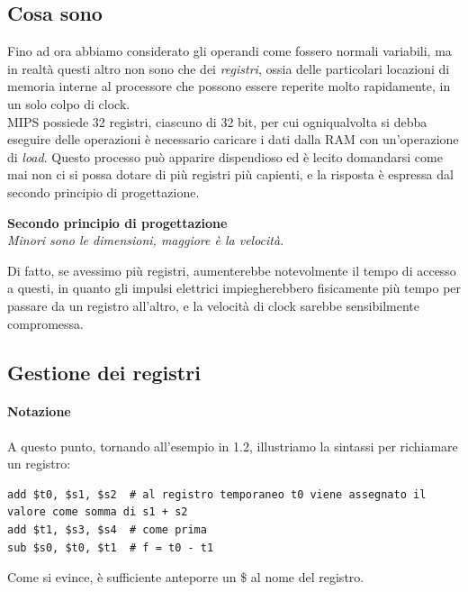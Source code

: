 \documentclass[class=book, crop=false]{standalone}
\begin{document}
\subsection*{Cosa sono}

Fino ad ora abbiamo considerato gli operandi come fossero normali variabili, ma in realtà questi altro non sono che dei \emph{registri}, ossia delle particolari locazioni di memoria interne al processore che possono essere reperite molto rapidamente, in un solo colpo di clock.\\

MIPS possiede 32 registri, ciascuno di 32 bit, per cui ogniqualvolta si debba eseguire delle operazioni è necessario caricare i dati dalla RAM con un'operazione di \emph{load}. Questo processo può apparire dispendioso ed è lecito domandarsi come mai non ci si possa dotare di più registri più capienti, e la risposta è espressa dal secondo principio di progettazione.

\vspace{8pt}
\begin{tcolorbox}
\centering
\textbf{Secondo principio di progettazione}\\
\emph{Minori sono le dimensioni, maggiore è la velocità}.
\end{tcolorbox}
\vspace{5pt}

Di fatto, se avessimo  più registri, aumenterebbe notevolmente il tempo di accesso a questi, in quanto gli impulsi elettrici impiegherebbero fisicamente più tempo per passare da un registro all'altro, e la velocità di clock sarebbe sensibilmente compromessa.

\subsection*{Gestione dei registri}

\paragraph{Notazione}
A questo punto, tornando all'esempio in 1.2, illustriamo la sintassi per richiamare un registro:
\begin{verbatim}
add $t0, $s1, $s2  # al registro temporaneo t0 viene assegnato il valore come somma di s1 + s2
add $t1, $s3, $s4  # come prima
sub $s0, $t0, $t1  # f = t0 - t1
\end{verbatim}
Come si evince, è sufficiente anteporre un \$ al nome del registro.
\end{document}
